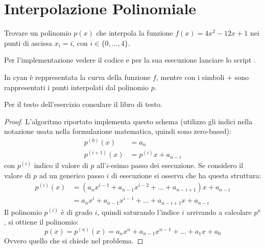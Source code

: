 \section{Interpolazione Polinomiale} 

\begin{exercise}[4.1] 
Trovare un polinomio $p(x)$ che interpola la funzione $f(x) = 4x^{2} -12x +1$
nei punti di ascissa $x_{i} = i$, con $ i \in \{ 0,\ldots, 4 \}$.
\end{exercise}
Per l'implementazione vedere il codice  e per la 
sua esecuzione lanciare lo script .
\begin{center} 

\end{center}
In cyan \`e reppresentata la curva della funzione $f$, mentre con i simboli
$+$ sono rappresentati i punti interpolati dal polinomio $p$.

\begin{exercise}[4.2] 
Per il testo dell'esercizio consulare il libro di testo.
\end{exercise}
\begin{proof}
L'algoritmo riportato implementa questo schema (utilizzo gli indici nella
notazione usata nella formulazione matematica, quindi sono zero-based):
\begin{displaymath}
\begin{split}
	p^{(0)}(x) &= a_{n} \\
	p^{(i+1)}(x) &= p^{(i)}x + a_{n-i} 
\end{split}
\end{displaymath}
con $p^{(i)}$ indico il valore di $p$ all'$i$-esimo passo dei esecuzione. 
Se considero il valore di $p$ ad un generico passo $i$ di esecuzione si
osserva che ha questa struttura:
\begin{displaymath}
\begin{split}
	p^{(i)}(x) &= (a_{n}x^{i-1} + a_{n-1}x^{i-2} + \ldots + a_{n-i+1})x + a_{n-i}\\
	&= a_{n}x^{i} + a_{n-1}x^{i-1} + \ldots + a_{n-i+1}x + a_{n-i}
\end{split}
\end{displaymath}
Il polinomio $p^{(i)}$ \`e di grado $i$, quindi saturando l'indice $i$ arrivando
a calcolare $p^{n}$, si ottiene il polinomio:
\begin{displaymath}
	p(x) = p^{(n)}(x) = a_{n}x^{n} + a_{n-1}x^{n-1} + \ldots + a_{1}x + a_{0}
\end{displaymath}
Ovvero quello che si chiede nel problema.
\end{proof}

